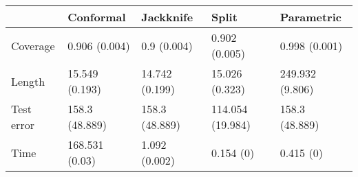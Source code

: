 \begin{tabular}{|l|l|l|l|l|}
\hline
& Conformal & Jackknife & Split & Parametric \\
\hline
Coverage & 0.906 (0.004) & 0.9 (0.004) & 0.902 (0.005) & 0.998 (0.001) \\
\hline
Length & 15.549 (0.193) & 14.742 (0.199) & 15.026 (0.323) & 249.932 (9.806) \\
\hline
Test error & 158.3 (48.889) & 158.3 (48.889) & 114.054 (19.984) & 158.3 (48.889) \\
\hline
Time & 168.531 (0.03) & 1.092 (0.002) & 0.154 (0) & 0.415 (0) \\
\hline
\end{tabular}

